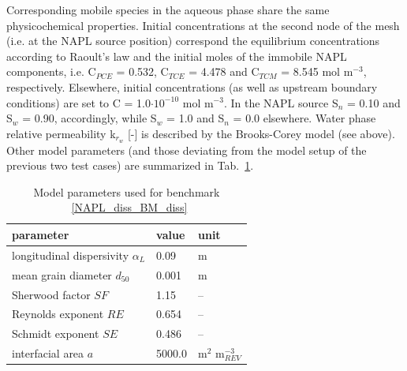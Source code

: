 Corresponding mobile species in the aqueous phase share the same physicochemical properties. Initial concentrations at the second node of the mesh (i.e. at the NAPL source position) correspond the equilibrium concentrations according to Raoult's law and the initial moles of the immobile NAPL components, i.e. C$_{PCE}$ = 0.532, C$_{TCE}$ = 4.478 and C$_{TCM}$ = 8.545 mol m$^{-3}$, respectively. Elsewhere, initial concentrations (as well as upstream boundary conditions) are set to C = 1.0$\cdot10^{-10}$ mol m$^{-3}$. In the NAPL source S$_n$ = 0.10 and S$_w$ = 0.90, accordingly, while S$_w$ = 1.0 and S$_n$ = 0.0 elsewhere. Water phase relative permeability k${_{r_w}}$ [-] is described by the Brooks-Corey model (see above). Other model parameters (and those deviating from the model setup of the previous two test cases) are summarized in Tab.~\ref{l_tab_benchmark_1d_HKAS_hydr}.

\begin{table}[htbp]
\caption{Model parameters used for benchmark ~\ref{NAPL_diss_BM_diss} }
\centering
\begin{tabular}{|l|l|l|}
\hline
parameter & value & unit \\
\hline
longitudinal dispersivity  $\alpha_L$  & 0.09 &  m\\
\hline
mean grain diameter $d_{50}$  & 0.001 &  m\\
\hline
Sherwood factor $SF$  & 1.15 &  --\\
\hline
Reynolds exponent $RE$  & 0.654 &  --\\
\hline
Schmidt exponent $SE$  & 0.486 &  --\\
\hline
interfacial area $a$  & 5000.0 &  m$^2$ m$^{-3}_{REV}$\\
\hline
\end{tabular}
\label{l_tab_benchmark_1d_HKAS_hydr}
\end{table}



